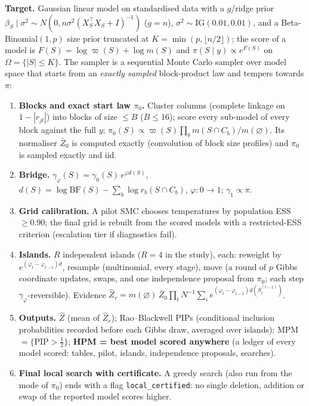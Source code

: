 \documentclass[10pt]{article}
\begin{document}
\textbf{Target.} Gaussian linear model on standardised data with a $g$/ridge prior $\beta_S\mid\sigma^2\sim N(0,n\sigma^2(X_S^\top X_S+I)^{-1})$
($g=n$), $\sigma^2\sim\mathrm{IG}(0.01,0.01)$, and a Beta-Binomial$(1,p)$ size prior truncated at $K=\min(p,\lfloor n/2\rfloor)$; the score of a model is
$F(S)=\log\varpi(S)+\log m(S)$ and $\pi(S\mid y)\propto e^{F(S)}$ on $\Omega=\{|S|\le K\}$.
The sampler is a sequential Monte Carlo sampler over model space that starts from an \emph{exactly sampled} block-product law and tempers towards $\pi$:
\begin{enumerate}
\item \textbf{Blocks and exact start law $\pi_0$.} Cluster columns (complete linkage on $1-|r_{jl}|$) into blocks of size $\le B$ ($B\le16$); score every sub-model of every block against the full $y$;
 $\pi_0(S)\propto\varpi(S)\prod_b m(S\cap C_b)/m(\varnothing)$. Its normaliser $\bar Z_0$ is computed exactly (convolution of block size profiles) and $\pi_0$ is sampled exactly and iid.
\item \textbf{Bridge.} $\gamma_\varphi(S)=\gamma_0(S)\,e^{\varphi d(S)}$, $d(S)=\log\mathrm{BF}(S)-\sum_b\log r_b(S\cap C_b)$, $\varphi:0\to1$; $\gamma_1\propto\pi$.
\item \textbf{Grid calibration.} A pilot SMC chooses temperatures by population ESS $\ge0.90$; the final grid is rebuilt from the scored models with a restricted-ESS criterion (escalation tier if diagnostics fail).
\item \textbf{Islands.} $R$ independent islands ($R=4$ in the study), each: reweight by $e^{(\varphi_t-\varphi_{t-1})d}$, resample (multinomial, every stage), move (a round of $p$ Gibbs coordinate updates, swaps, and one independence proposal from $\pi_0$; each step $\gamma_\varphi$-reversible). Evidence
 $\hat Z_r=m(\varnothing)\,\bar Z_0\prod_t N^{-1}\sum_i e^{(\varphi_t-\varphi_{t-1})d(S_i^{(t-1)})}$.
\item \textbf{Outputs.} $\hat Z$ (mean of $\hat Z_r$); Rao--Blackwell PIPs (conditional inclusion probabilities recorded before each Gibbs draw, averaged over islands); MPM $=\{\mathrm{PIP}>\tfrac12\}$;
 \textbf{HPM = best model scored anywhere} (a ledger of every model scored: tables, pilot, islands, independence proposals, searches).
\item \textbf{Final local search with certificate.} A greedy search (also run from the mode of $\pi_0$) ends with a flag \texttt{local\_certified}: no single deletion, addition or swap of the reported model scores higher.
\end{enumerate}
\end{document}

